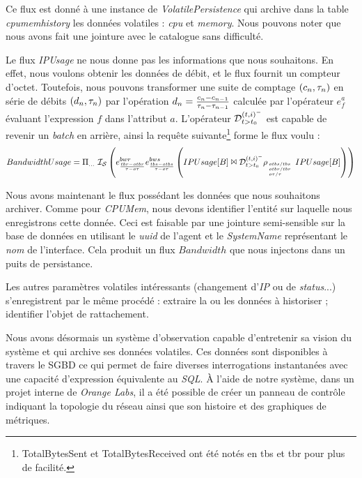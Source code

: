 Ce flux est donné à une instance de \textit{VolatilePersistence} qui archive dans la table \textit{cpumemhistory} les données volatiles : \textit{cpu} et \textit{memory}. Nous pouvons noter que nous avons fait une jointure avec le catalogue sans difficulté.

Le flux \textit{IPUsage} ne nous donne pas les informations que nous souhaitons. En effet, nous voulons obtenir les données de débit, et le flux fournit un compteur d'octet. Toutefois, nous pouvons transformer une suite de comptage $(c_n,\tau_n)$ en série de débits $(d_n,\tau_n)$ par l'opération $d_n=\frac{c_n-c_{n-1}}{\tau_n-\tau_{n-1}}$ calculée par l'opérateur $e_f^a$ évaluant l'expression $f$ dans l'attribut $a$. L'opérateur $\mathcal{D}_{t>t_0}^{(t,i)^-}$ est capable de revenir un \textit{batch} en arrière, ainsi la requête suivante\footnote{TotalBytesSent et TotalBytesReceived ont été notés en tbs et tbr pour plus de facilité.} forme le flux voulu :
$$BandwidthUsage = \Pi_{...}\ \mathcal{I_S} \left( e_{\frac{tbr-otbr}{\tau-o\tau}}^{bwr} e_{\frac{tbs-otbs}{\tau-o\tau}}^{bws}\left(IPUsage[B] \Join \mathcal{D}_{t>t_0}^{(t,i)^-} \rho_{\hspace{-0.33em}\mbox{\tiny $\begin{array}{l} otbs/tbs\\otbr/tbr\\ o\tau/\tau\end{array}$}}IPUsage[B]\right)\right)$$

Nous avons maintenant le flux possédant les données que nous souhaitons archiver. Comme pour \textit{CPUMem}, nous devons identifier l'entité sur laquelle nous enregistrons cette donnée. Ceci est faisable par une jointure semi-sensible sur la base de données en utilisant le \textit{uuid} de l'agent et le \textit{SystemName} représentant le \textit{nom} de l'interface. Cela produit un flux $Bandwidth$ que nous injectons dans un puits de persistance.

Les autres paramètres volatiles intéressants (changement d'\textit{IP} ou de \textit{status}...) s'enregistrent par le même procédé : extraire la ou les données à historiser ; identifier l'objet de rattachement.

Nous avons désormais un système d'observation capable d'entretenir sa vision du système et qui archive ses données volatiles. Ces données sont disponibles à travers le SGBD ce qui permet de faire diverses interrogations instantanées avec une capacité d'expression équivalente au \textit{SQL}. À l'aide de notre système, dans un projet interne de \textit{Orange Labs}, il a été possible de créer un panneau de contrôle indiquant la topologie du réseau ainsi que son histoire et des graphiques de métriques.

